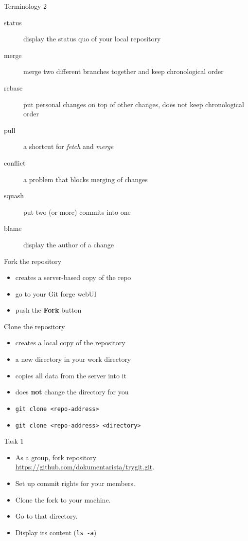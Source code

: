 \documentclass[14pt]{beamer}
\begin{document}
	\begin{frame}{Terminology 2}
	\begin{description}
		\item[status] display the status quo of your local repository
		\item[merge] merge two different branches together and keep chronological order
		\item[rebase] put personal changes on top of other changes, does not keep chronological order
		\item[pull] a shortcut for \textit{fetch} and \textit{merge}
		\item[conflict] a problem that blocks merging of changes
		\item[squash] put two (or more) commits into one
		\item[blame] display the author of a change
	\end{description}
	\end{frame}

	\begin{frame}{Fork the repository}
	\begin{itemize}
		\item creates a server-based copy of the repo
		\item go to your Git forge webUI
		\item push the \textbf{Fork} button
	\end{itemize}
	\end{frame}


	\begin{frame}{Clone the repository}
	\begin{itemize}
		\item creates a local copy of the repository
		\item a new directory in your work directory
		\item copies all data from the server into it
		\item does \textbf{not} change the directory for you
		\item \texttt{git clone <repo-address>}
		\item \texttt{git clone <repo-address> <directory>}
	\end{itemize}

	\end{frame}

	\begin{frame}{Task 1}
	\begin{itemize}
		\item As a group, fork repository \\ {\small \url{https://github.com/dokumentarista/trygit.git}}.
		\item Set up commit rights for your members.
		\item Clone the fork to your machine.
		\item Go to that directory.
		\item Display its content (\texttt{ls -a})
	\end{itemize}
	
	\end{frame}
\end{document}
